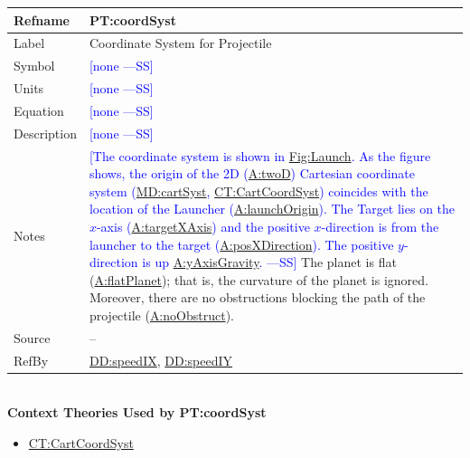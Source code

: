 \documentclass[12pt]{article}
\newcommand{\authornote}[3]{\textcolor{#1}{[#3 ---#2]}}
\newcommand{\authornote}[3]{}
\newcommand{\wss}[1]{\authornote{blue}{SS}{#1}}
\begin{document}
\medskip
\noindent
\begin{minipage}{\textwidth}
\begin{tabular}{>{\raggedright}p{}>{\raggedright\arraybackslash}p{}}
\toprule \textbf{Refname} & \textbf{PT:coordSyst}
\label{PT:coordSyst}
\\ \midrule
Label & Coordinate System for Projectile
        
\\ \midrule
Symbol & \wss{none}
         
\\ \midrule
Units & \wss{none}
        
\\ \midrule
Equation & \wss{none}

\\ \midrule
Description & \wss{none}

\\ \midrule Notes & \wss{The coordinate system is shown in
\hyperref[Figure:Launch]{Fig:Launch}.  As the figure shows, the origin of the 2D
(\hyperref[twoD]{A:twoD}) Cartesian coordinate system
(\hyperref[MD:cartSyst]{MD:cartSyst},
\hyperref[CT:CartCoordSyst]{CT:CartCoordSyst}) coincides with the location of
the Launcher (\hyperref[launchOrigin]{A:launchOrigin}). The Target lies on the
$x$-axis (\hyperref[targetXAxis]{A:targetXAxis}) and the positive $x$-direction
is from the launcher to the target (\hyperref[posXDirection]{A:posXDirection}).
The positive $y$-direction is up \hyperref[yAxisGravity]{A:yAxisGravity}.}  The
planet is flat (\hyperref[flatPlanet]{A:flatPlanet}); that is, the curvature of
the planet is ignored.  Moreover, there are no obstructions blocking the path of
the projectile (\hyperref[noObstruct]{A:noObstruct}).
        
\\ \midrule
Source & --
         
\\ \midrule
RefBy & \hyperref[DD:speedIX]{DD:speedIX}, \hyperref[DD:speedIY]{DD:speedIY}
        
\\ \bottomrule
\end{tabular}
\end{minipage}
~\\

\noindent \textbf{Context Theories Used by PT:coordSyst}

\begin{itemize}
\item \hyperref[CT:CartCoordSyst]{CT:CartCoordSyst}
\end{itemize}
\end{document}
